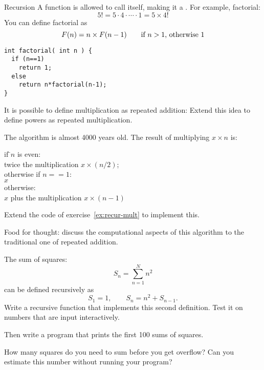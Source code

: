 \begin{slide}{Recursion}
  \label{sl:func-recur}
  A function is allowed to call itself, making it a .
  For example, factorial:
  \[ 5! = 5\cdot 4 \cdot \cdots \cdot 1 = 5 \times 4! \]
  You can define factorial as
  \[ F(n) = n \times F(n-1) \qquad \hbox{if $n>1$, otherwise~$1$} \]
\begin{lstlisting}
int factorial( int n ) {
  if (n==1)
    return 1;
  else
    return n*factorial(n-1);
}
\end{lstlisting}
\end{slide}

\begin{exercise}
  \label{ex:recur-mult}
  It is possible to define multiplication as repeated addition:
  Extend this idea to define powers as repeated multiplication.
\end{exercise}

\begin{exercise}
  \label{ex:peasant-mult}
  The  algorithm is almost 4000 years old.
  The result of multiplying $x\times n$ is:

  \begin{tabbing}
    if \=$n$ is even:\\
    \> twice the multiplication $x\times (n/2)$;\\
    otherwise if $n==1$:\\
    \> $x$\\
    otherwise:\\
    \> $x$ plus the multiplication $x \times (n-1)$\\
  \end{tabbing}

  Extend the code of exercise~\ref{ex:recur-mult} to implement this.

  Food for thought: discuss the computational aspects of this algorithm
  to the traditional one of repeated addition.
\end{exercise}

\begin{exercise}
  \label{ex:recur-sum}
  The sum of squares:
  \[ S_n = \sum_{n=1}^N n^2 \]
  can be defined recursively as
  \[ S_1=1,\qquad S_n = n^2 + S_{n-1}. \]
  Write a recursive function that implements this second definition.
  Test it on numbers that are input interactively.

  Then write a program that prints the first 100 sums of squares.

  How many squares do you need to sum before you get overflow?
  Can you estimate this number without running your program?
\end{exercise}

